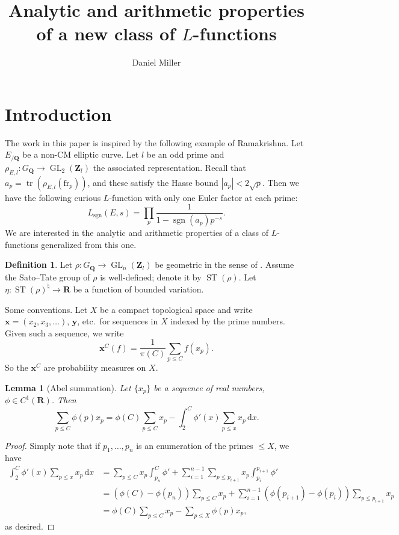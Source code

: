 \documentclass{article}
\title{Analytic and arithmetic properties of a new class of \texorpdfstring{$L$}{L}-functions}
\author{Daniel Miller}
\DeclareMathOperator{\GL}{GL}
\DeclareMathOperator{\sgn}{sgn}
\DeclareMathOperator{\ST}{ST}
\DeclareMathOperator{\tr}{tr}
\newcommand{\bQ}{\mathbf{Q}}
\newcommand{\bR}{\mathbf{R}}
\newcommand{\bx}{\boldsymbol{x}}
\newcommand{\by}{\boldsymbol{y}}
\newcommand{\bZ}{\mathbf{Z}}
\newcommand{\dd}{\mathrm{d}}
\newcommand{\frob}{\mathrm{fr}}
\newtheorem{lemma}[subsection]{Lemma}
\theoremstyle{definition}
\newtheorem{definition}[subsection]{Definition}
\begin{document}
\maketitle





\section{Introduction}

The work in this paper is inspired by the following example of Ramakrishna. Let 
$E_{/\bQ}$ be a non-CM elliptic curve. Let $l$ be an odd prime and 
$\rho_{E,l}\colon G_\bQ \to \GL_2(\bZ_l)$ the associated representation. Recall 
that $a_p = \tr(\rho_{E,l}(\frob_p))$, and these satisfy the Hasse bound 
$|a_p|<2\sqrt p$. Then we have the following curious $L$-function with only one 
Euler factor at each prime: 
\[
	L_{\sgn}(E,s) = \prod_p \frac{1}{1-\sgn(a_p) p^{-s}} .
\]
We are interested in the analytic and arithmetic properties of a class of 
$L$-functions generalized from this one. 

\begin{definition}
Let $\rho\colon G_\bQ \to \GL_n(\bZ_l)$ be geometric in the sense of 
\cite{fontain-mazur-1995}. Assume the Sato--Tate group of $\rho$ is 
well-defined; denote it by $\ST(\rho)$. Let 
$\eta\colon \ST(\rho)^\natural \to \bR$ be a function of bounded variation.  
\end{definition}

Some conventions. Let $X$ be a compact topological space and 
write $\bx = (x_2,x_3,\dots)$, $\by$, etc.~for sequences in $X$ 
indexed by the prime numbers. Given such a sequence, we write 
\[
	\bx^C(f) = \frac{1}{\pi(C)}\sum_{p\leqslant C} f(x_p) .
\]
So the $\bx^C$ are probability measures on $X$. 





\begin{lemma}[Abel summation]\label{lem:abel}
Let $\{x_p\}$ be a sequence of real numbers, $\phi\in C^1(\bR)$. Then 
\[
	\sum_{p\leqslant C} \phi(p) x_p = \phi(C) \sum_{p\leqslant C} x_p - \int_2^C \phi'(x) \sum_{p\leqslant x} x_p\, \dd x .
\]
\end{lemma}
\begin{proof}
Simply note that if $p_1,\dots,p_n$ is an enumeration of the primes 
$\leqslant X$, we have 
\begin{align*}
	\int_2^C \phi'(x) \sum_{p\leqslant x} x_p\, \dd x 
		&= \sum_{p\leqslant C} x_p\int_{p_n}^C \phi' + \sum_{i=1}^{n-1} \sum_{p\leqslant p_{i+1}}x_p\int_{p_i}^{p_{i+1}} \phi' \\
		&= (\phi(C)-\phi(p_n))\sum_{p\leqslant C} x_p + \sum_{i=1}^{n-1} (\phi(p_{i+1})-\phi(p_i)) \sum_{p\leqslant p_{i+1}} x_p \\
		&= \phi(C) \sum_{p\leqslant C} x_p - \sum_{p\leqslant X} \phi(p) x_p ,
\end{align*}
as desired.
\end{proof}
\end{document}
